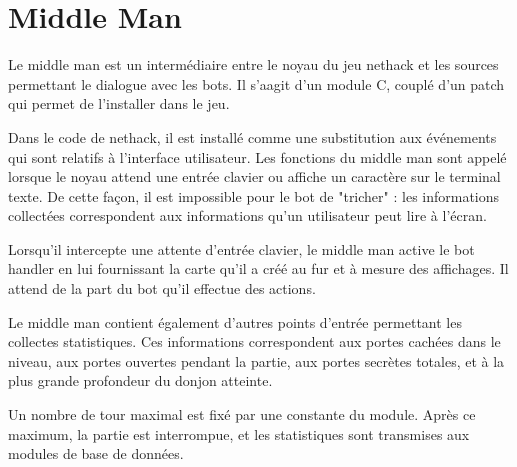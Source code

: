 \section{Middle Man}
Le middle man est un intermédiaire entre le noyau du jeu nethack
et les sources permettant le dialogue avec les bots. Il s'aagit d'un module C,
couplé d'un patch qui permet de l'installer dans le jeu.

Dans le code de nethack,
il est installé comme une substitution aux événements qui sont relatifs
à l'interface utilisateur. Les fonctions du middle man sont appelé lorsque le
noyau attend une entrée clavier ou affiche un caractère sur le terminal texte.
De cette façon, il est impossible pour le bot de "tricher" : les informations 
collectées correspondent aux informations qu'un utilisateur peut lire à l'écran.

Lorsqu'il intercepte une attente d'entrée clavier, le middle man active le
bot handler en lui fournissant la carte qu'il a créé au fur et à mesure des affichages.
Il attend de la part du bot qu'il effectue des actions. 

Le middle man contient également d'autres points d'entrée permettant les collectes 
statistiques. Ces informations correspondent aux portes cachées dans le niveau, aux portes
ouvertes pendant la partie, aux portes secrètes totales, et à la plus grande
profondeur du donjon atteinte.

Un nombre de tour maximal est fixé par une constante du module.
Après ce maximum, la partie est interrompue, et les statistiques sont transmises aux modules de
base de données.

